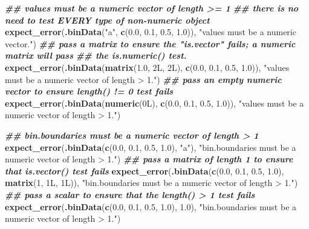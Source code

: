 \documentclass[
]{book}
\newenvironment{Shaded}{\begin{snugshade}}{\end{snugshade}}
\newcommand{\DecValTok}[1]{\textcolor[rgb]{0.00,0.00,0.81}{#1}}
\newcommand{\DocumentationTok}[1]{\textcolor[rgb]{0.56,0.35,0.01}{\textbf{\textit{#1}}}}
\newcommand{\FloatTok}[1]{\textcolor[rgb]{0.00,0.00,0.81}{#1}}
\newcommand{\FunctionTok}[1]{\textcolor[rgb]{0.13,0.29,0.53}{\textbf{#1}}}
\newcommand{\NormalTok}[1]{#1}
\newcommand{\StringTok}[1]{\textcolor[rgb]{0.31,0.60,0.02}{#1}}
\begin{document}
\begin{Shaded}
\begin{Highlighting}[]
  \DocumentationTok{\#\# \textasciigrave{}values\textasciigrave{} must be a numeric vector of length \textgreater{}= 1}
  \DocumentationTok{\#\# there is no need to test EVERY type of non{-}numeric object}
  \FunctionTok{expect\_error}\NormalTok{(}\FunctionTok{.binData}\NormalTok{(}\StringTok{"a"}\NormalTok{, }\FunctionTok{c}\NormalTok{(}\FloatTok{0.0}\NormalTok{, }\FloatTok{0.1}\NormalTok{, }\FloatTok{0.5}\NormalTok{, }\FloatTok{1.0}\NormalTok{)),}
               \StringTok{"\textasciigrave{}values\textasciigrave{} must be a numeric vector."}\NormalTok{)}
  \DocumentationTok{\#\# pass a matrix to ensure the "is.vector" fails; a numeric matrix will pass}
  \DocumentationTok{\#\# the is.numeric() test.}
  \FunctionTok{expect\_error}\NormalTok{(}\FunctionTok{.binData}\NormalTok{(}\FunctionTok{matrix}\NormalTok{(}\FloatTok{1.0}\NormalTok{, 2L, 2L), }\FunctionTok{c}\NormalTok{(}\FloatTok{0.0}\NormalTok{, }\FloatTok{0.1}\NormalTok{, }\FloatTok{0.5}\NormalTok{, }\FloatTok{1.0}\NormalTok{)),}
               \StringTok{"\textasciigrave{}values\textasciigrave{} must be a numeric vector of length \textgreater{} 1."}\NormalTok{)}
  \DocumentationTok{\#\# pass an empty numeric vector to ensure length() != 0 test fails}
  \FunctionTok{expect\_error}\NormalTok{(}\FunctionTok{.binData}\NormalTok{(}\FunctionTok{numeric}\NormalTok{(0L), }\FunctionTok{c}\NormalTok{(}\FloatTok{0.0}\NormalTok{, }\FloatTok{0.1}\NormalTok{, }\FloatTok{0.5}\NormalTok{, }\FloatTok{1.0}\NormalTok{)),}
               \StringTok{"\textasciigrave{}values\textasciigrave{} must be a numeric vector of length \textgreater{} 1."}\NormalTok{)}
  
  
  \DocumentationTok{\#\# \textasciigrave{}bin.boundaries\textasciigrave{} must be a numeric vector of length \textgreater{} 1}
  \FunctionTok{expect\_error}\NormalTok{(}\FunctionTok{.binData}\NormalTok{(}\FunctionTok{c}\NormalTok{(}\FloatTok{0.0}\NormalTok{, }\FloatTok{0.1}\NormalTok{, }\FloatTok{0.5}\NormalTok{, }\FloatTok{1.0}\NormalTok{), }\StringTok{"a"}\NormalTok{),}
               \StringTok{"\textasciigrave{}bin.boundaries\textasciigrave{} must be a numeric vector of length \textgreater{} 1."}\NormalTok{)}
  \DocumentationTok{\#\# pass a matrix of length 1 to ensure that is.vector() test fails}
  \FunctionTok{expect\_error}\NormalTok{(}\FunctionTok{.binData}\NormalTok{(}\FunctionTok{c}\NormalTok{(}\FloatTok{0.0}\NormalTok{, }\FloatTok{0.1}\NormalTok{, }\FloatTok{0.5}\NormalTok{, }\FloatTok{1.0}\NormalTok{), }\FunctionTok{matrix}\NormalTok{(}\DecValTok{1}\NormalTok{, 1L, 1L)),}
               \StringTok{"\textasciigrave{}bin.boundaries\textasciigrave{} must be a numeric vector of length \textgreater{} 1."}\NormalTok{)}
  \DocumentationTok{\#\# pass a scalar to ensure that the length() \textgreater{} 1 test fails}
  \FunctionTok{expect\_error}\NormalTok{(}\FunctionTok{.binData}\NormalTok{(}\FunctionTok{c}\NormalTok{(}\FloatTok{0.0}\NormalTok{, }\FloatTok{0.1}\NormalTok{, }\FloatTok{0.5}\NormalTok{, }\FloatTok{1.0}\NormalTok{), }\FloatTok{1.0}\NormalTok{),}
               \StringTok{"\textasciigrave{}bin.boundaries\textasciigrave{} must be a numeric vector of length \textgreater{} 1."}\NormalTok{)}


\end{Highlighting}
\end{Shaded}
\end{document}
